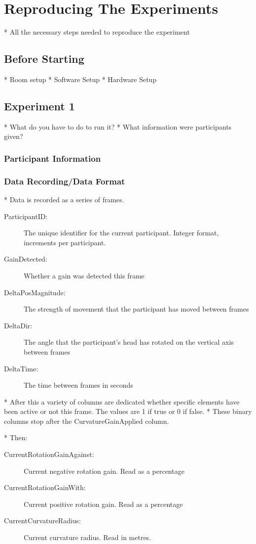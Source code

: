 \chapter{Reproducing The Experiments} \label{app:reproduction}
* All the necessary steps needed to reproduce the experiment

\section{Before Starting}
* Room setup
* Software Setup
* Hardware Setup

\section{Experiment 1}
* What do you have to do to run it?
* What information were participants given?

\subsection{Participant Information}\label{sec:ex1information}

\subsection{Data Recording/Data Format}\label{sec:ex1dataformat}
* Data is recorded as a series of frames.

\begin{description}
   \item[ParticipantID: ] The unique identifier for the current participant. Integer format, increments per participant. 
   \item[GainDetected: ] Whether a gain was detected this frame
   \item[DeltaPosMagnitude: ] The strength of movement that the participant has moved between frames
   \item[DeltaDir: ] The angle that the participant's head has rotated on the vertical axis between frames
   \item[DeltaTime: ] The time between frames in seconds
\end{description}
* After this a variety of columns are dedicated whether specific elements have been active or not this frame. The values are 1 if true or 0 if false.
* These binary columns stop after the CurvatureGainApplied column. 

* Then:
\begin{description}
   \item[CurrentRotationGainAgainst: ] Current negative rotation gain. Read as a percentage
   \item[CurrentRotationGainWith: ] Current positive rotation gain. Read as a percentage
   \item[CurrentCurvatureRadius: ] Current curvature radius. Read in metres. 
\end{description}

